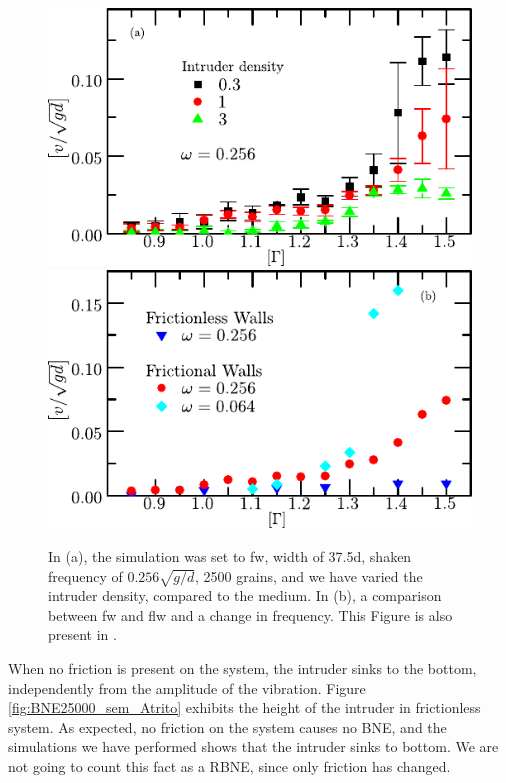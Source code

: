 \begin{figure}[H]
    \centering
    \includegraphics[width=0.65\linewidth]{04-figuras/BNE_FW_Density.pdf} \\
    \includegraphics[width=0.65\linewidth]{04-figuras/BNE_W.pdf}
    \caption[BNE with frictional walls: Ascent rate versus $\Gamma$.]{In (a), the simulation was set to fw, width of 37.5d, shaken frequency of $0.256\sqrt{g/d}$, 2500 grains, and we have varied the intruder density, compared to the medium. In (b), a comparison between fw and flw and a change in frequency. This Figure is also present in \cite{Large-deviation_quantification_of_boundary_conditions_on_the_Brazil_nut_effect}.}
    \label{fig:BNE_walls}
\end{figure}

    When no friction is present on the system, the intruder sinks to the bottom, independently from the amplitude of the vibration. Figure \ref{fig:BNE25000_sem_Atrito} exhibits the height of the intruder in frictionless system. As expected, no friction on the system causes no BNE, and the simulations we have performed shows that the intruder sinks to bottom. We are not going to count this fact as a RBNE, since only friction has changed.


